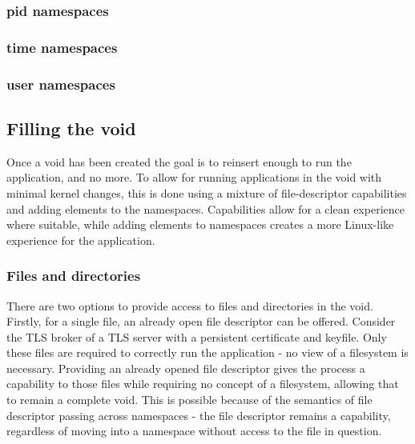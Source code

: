 \documentclass[sigplan]{acmart}
\begin{document}

\subsubsection{pid namespaces}


\subsubsection{time namespaces}


\subsubsection{user namespaces}


\subsection{Filling the void}

Once a void has been created the goal is to reinsert enough to run the application, and no more. To allow for running applications in the void with minimal kernel changes, this is done using a mixture of file-descriptor capabilities and adding elements to the namespaces. Capabilities allow for a clean experience where suitable, while adding elements to namespaces creates a more Linux-like experience for the application.

\subsubsection{Files and directories} There are two options to provide access to files and directories in the void. Firstly, for a single file, an already open file descriptor can be offered. Consider the TLS broker of a TLS server with a persistent certificate and keyfile. Only these files are required to correctly run the application - no view of a filesystem is necessary. Providing an already opened file descriptor gives the process a capability to those files while requiring no concept of a filesystem, allowing that to remain a complete void. This is possible because of the semantics of file descriptor passing across namespaces - the file descriptor remains a capability, regardless of moving into a namespace without access to the file in question.
\end{document}
